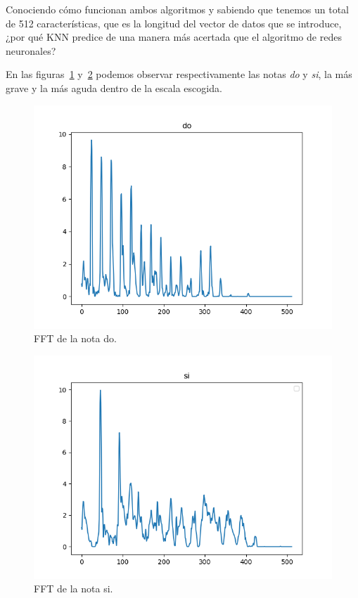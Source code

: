 \documentclass[a4paper, 12pt]{book}
\begin{document}
\pagebreak

Conociendo cómo funcionan ambos algoritmos y sabiendo que tenemos un total de 512 características, que es la longitud del vector de datos que se introduce, ¿por qué KNN predice de una manera más acertada que el algoritmo de redes neuronales?

En las figuras~\ref{fig:do} y~\ref{fig:si} podemos observar respectivamente las notas \textit{do} y \textit{si}, la más grave y la más aguda dentro de la escala escogida.

\begin{figure}
	\centering
	\includegraphics[width=12cm]{img/do.png}
	\caption{FFT de la nota do.}\label{fig:do}
\end{figure}

\begin{figure}
	\centering
	\includegraphics[width=12cm]{img/si.png}
	\caption{FFT de la nota si.}\label{fig:si}
\end{figure}
\end{document}
